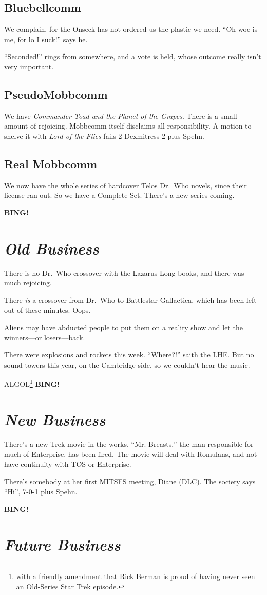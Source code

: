 \documentclass[10pt]{article}
\newcommand{\bing}{{\bf BING!} }
\newcommand{\goto}[1]{\bing \vskip 12pt \section*{{\em{#1}}}}
\newcommand{\ps}{ plus Spehn\xspace}
\begin{document}
\subsection*{Bluebellcomm}
We complain, for the Onseck has not ordered us the plastic we need.
``Oh woe is me, for lo I suck!'' says he.

``Seconded!'' rings from somewhere, and a vote is held, whose outcome
really isn't very important.

\subsection*{PseudoMobbcomm}
We have \emph{Commander Toad and the Planet of the Grapes}.  There is
a small amount of rejoicing.  Mobbcomm itself disclaims all
responsibility.  A motion to shelve it with \emph{Lord of the Flies}
fails 2-Dexmitress-2\ps.

\subsection*{Real Mobbcomm}
We now have the whole series of hardcover Telos Dr.\ Who novels, since
their license ran out.  So we have a Complete Set.  There's a new
series coming.

\goto{Old Business}

There is no Dr.\ Who crossover with the Lazarus Long books, and there
was much rejoicing.

There \emph{is} a crossover from Dr.\ Who to Battlestar Gallactica,
which has been left out of these minutes.  Oops.

Aliens may have abducted people to put them on a reality show and let
the winners---or losers---back.

There were explosions and rockets this week.  ``Where?!'' saith the
LHE.  But no sound towers this year, on the Cambridge side, so we
couldn't hear the music.

ALGOL\footnote{with a friendly amendment that Rick Berman is proud of
  having never seen an Old-Series Star Trek episode.}
\goto{New Business}

There's a new Trek movie in the works.  ``Mr. Breasts,'' the man
responsible for much of Enterprise, has been fired.  The movie will
deal with Romulans, and not have continuity with TOS or Enterprise.

There's somebody at her first MITSFS meeting, Diane (DLC).  The
society says ``Hi'', 7-0-1\ps.

\goto{Future Business}
\end{document}
